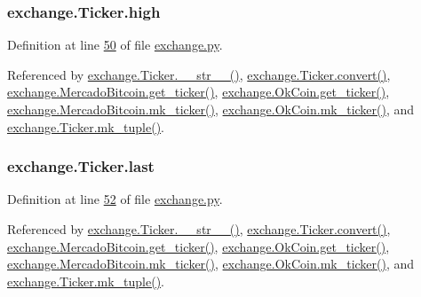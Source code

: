 \subsubsection[{\texorpdfstring{high}{high}}]{\setlength{\rightskip}{0pt plus 5cm}exchange.\+Ticker.\+high}\hypertarget{classexchange_1_1_ticker_aace381ca15468df6a40e8d86b7710a7f}{}\label{classexchange_1_1_ticker_aace381ca15468df6a40e8d86b7710a7f}


Definition at line \hyperlink{exchange_8py_source_l00050}{50} of file \hyperlink{exchange_8py_source}{exchange.\+py}.



Referenced by \hyperlink{exchange_8py_source_l00099}{exchange.\+Ticker.\+\_\+\+\_\+str\+\_\+\+\_\+()}, \hyperlink{exchange_8py_source_l00055}{exchange.\+Ticker.\+convert()}, \hyperlink{exchange_8py_source_l00306}{exchange.\+Mercado\+Bitcoin.\+get\+\_\+ticker()}, \hyperlink{exchange_8py_source_l00371}{exchange.\+Ok\+Coin.\+get\+\_\+ticker()}, \hyperlink{exchange_8py_source_l00320}{exchange.\+Mercado\+Bitcoin.\+mk\+\_\+ticker()}, \hyperlink{exchange_8py_source_l00385}{exchange.\+Ok\+Coin.\+mk\+\_\+ticker()}, and \hyperlink{exchange_8py_source_l00084}{exchange.\+Ticker.\+mk\+\_\+tuple()}.

\subsubsection[{\texorpdfstring{last}{last}}]{\setlength{\rightskip}{0pt plus 5cm}exchange.\+Ticker.\+last}\hypertarget{classexchange_1_1_ticker_add7c2d95fa790dcdffddae2e584ce5f5}{}\label{classexchange_1_1_ticker_add7c2d95fa790dcdffddae2e584ce5f5}


Definition at line \hyperlink{exchange_8py_source_l00052}{52} of file \hyperlink{exchange_8py_source}{exchange.\+py}.



Referenced by \hyperlink{exchange_8py_source_l00099}{exchange.\+Ticker.\+\_\+\+\_\+str\+\_\+\+\_\+()}, \hyperlink{exchange_8py_source_l00055}{exchange.\+Ticker.\+convert()}, \hyperlink{exchange_8py_source_l00306}{exchange.\+Mercado\+Bitcoin.\+get\+\_\+ticker()}, \hyperlink{exchange_8py_source_l00371}{exchange.\+Ok\+Coin.\+get\+\_\+ticker()}, \hyperlink{exchange_8py_source_l00320}{exchange.\+Mercado\+Bitcoin.\+mk\+\_\+ticker()}, \hyperlink{exchange_8py_source_l00385}{exchange.\+Ok\+Coin.\+mk\+\_\+ticker()}, and \hyperlink{exchange_8py_source_l00084}{exchange.\+Ticker.\+mk\+\_\+tuple()}.

